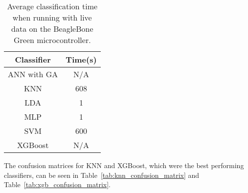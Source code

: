 \begin{table}[ht]
    \centering
    \begin{tabular}{c|c}
         \hline
         Classifier & Time(s) \\
         \hline
         ANN with GA & N/A \\
         KNN & 608 \\ 
         LDA & 1 \\ 
         MLP & 1 \\ 
         SVM & 600 \\
         XGBoost & N/A 
    \end{tabular}
    \caption{Average classification time when running with live data on the BeagleBone Green microcontroller.}
    \label{tab:classification time}
\end{table}
The confusion matrices for KNN and XGBoost, which were the best performing classifiers, can be seen in Table~\ref{tab:knn_confusion_matrix} and Table~\ref{tab:xgb_confusion_matrix}. 
\def\colorModel{hsb} %

